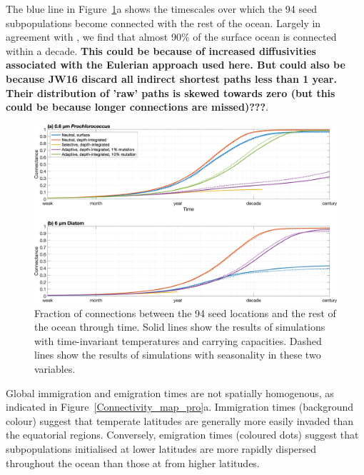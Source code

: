 \documentclass[12pt]{article}
\begin{document}
The blue line in Figure~\ref{Cumulative}a shows the timescales over which the 94 seed subpopulations become connected with the rest of the ocean. Largely in agreement with \citet{Jonsson:2016}, we find that almost 90\% of the surface ocean is connected within a decade. \textbf{This could be because of increased diffusivities associated with the Eulerian approach used here. But could also be because JW16 discard all indirect shortest paths less than 1 year. Their distribution of 'raw' paths is skewed towards zero (but this could be because longer connections are missed)???}.

\begin{figure}[htp!]
    \centering
        \includegraphics[width=1\textwidth]{../Figures/cumulative_connections.png}
\caption{Fraction of connections between the 94 seed locations and the rest of the ocean through time. Solid lines show the results of simulations with time-invariant temperatures and carrying capacities. Dashed lines show the results of simulations with seasonality in these two variables.}
\label{Cumulative}
\end{figure}

Global immigration and emigration times are not spatially homogenous, as indicated in Figure~\ref{Connectivity_map_pro}a. Immigration times (background colour) suggest that temperate latitudes are generally more easily invaded than the equatorial regions. Conversely, emigration times (coloured dots) suggest that subpopulations initialised at lower latitudes are more rapidly dispersed throughout the ocean than those at from higher latitudes. 
\end{document}
